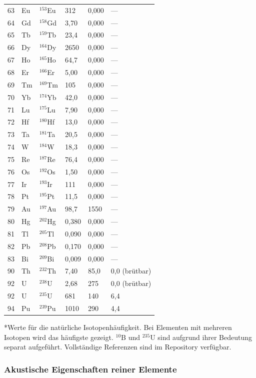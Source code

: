 \documentclass[12pt,a4paper]{article}
\begin{document}
\begin{longtable}{p{0.8cm}p{1.2cm}p{2.0cm}p{2.5cm}p{2.5cm}p{2.5cm}}
		63 & Eu & \(^{153}\)Eu & 312 & 0,000 & --- \\
		64 & Gd & \(^{158}\)Gd & 3,70 & 0,000 & --- \\
		65 & Tb & \(^{159}\)Tb & 23,4 & 0,000 & --- \\
		66 & Dy & \(^{164}\)Dy & 2650 & 0,000 & --- \\
		67 & Ho & \(^{165}\)Ho & 64,7 & 0,000 & --- \\
		68 & Er & \(^{166}\)Er & 5,00 & 0,000 & --- \\
		69 & Tm & \(^{169}\)Tm & 105 & 0,000 & --- \\
		70 & Yb & \(^{174}\)Yb & 42,0 & 0,000 & --- \\
		71 & Lu & \(^{175}\)Lu & 7,90 & 0,000 & --- \\
		72 & Hf & \(^{180}\)Hf & 13,0 & 0,000 & --- \\
		73 & Ta & \(^{181}\)Ta & 20,5 & 0,000 & --- \\
		74 & W  & \(^{184}\)W & 18,3 & 0,000 & --- \\
		75 & Re & \(^{187}\)Re & 76,4 & 0,000 & --- \\
		76 & Os & \(^{192}\)Os & 1,50 & 0,000 & --- \\
		77 & Ir & \(^{193}\)Ir & 111 & 0,000 & --- \\
		78 & Pt & \(^{195}\)Pt & 11,5 & 0,000 & --- \\
		79 & Au & \(^{197}\)Au & 98,7 & 1550 & --- \\
		80 & Hg & \(^{202}\)Hg & 0,380 & 0,000 & --- \\
		81 & Tl & \(^{205}\)Tl & 0,090 & 0,000 & --- \\
		82 & Pb & \(^{208}\)Pb & 0,170 & 0,000 & --- \\
		83 & Bi & \(^{209}\)Bi & 0,009 & 0,000 & --- \\
		90 & Th & \(^{232}\)Th & 7,40 & 85,0 & 0,0 (brütbar) \\
		92 & U  & \(^{238}\)U & 2,68 & 275 & 0,0 (brütbar) \\
		92 & U  & \(^{235}\)U & 681 & 140 & 6,4 \\
		94 & Pu & \(^{239}\)Pu & 1010 & 290 & 4,4 \\
		\bottomrule
	\end{longtable}
	*Werte für die natürliche Isotopenhäufigkeit. Bei Elementen mit mehreren Isotopen wird das häufigste gezeigt. \(^{10}\)B und \(^{235}\)U sind aufgrund ihrer Bedeutung separat aufgeführt. Vollständige Referenzen sind im Repository verfügbar.
	
	\subsubsection{Akustische Eigenschaften reiner Elemente}
	\label{subsec:acoustic-properties-func}
	
\end{document}
